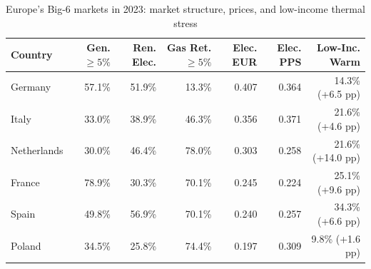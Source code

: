 \begin{table}[ht]
\centering
\caption{Europe's Big-6 markets in 2023: market structure, prices, and low-income thermal stress}
\label{tab:big6_2023}
\small
\begin{tabular}{@{}lrrrrrr@{}}
\toprule
Country & Gen. $\ge 5\%$ & Ren. Elec. & Gas Ret. $\ge 5\%$ & Elec. EUR & Elec. PPS & Low-Inc. Warm \\
\midrule
Germany & 57.1\% & 51.9\% & 13.3\% & 0.407 & 0.364 & 14.3\% (+6.5 pp) \\
Italy & 33.0\% & 38.9\% & 46.3\% & 0.356 & 0.371 & 21.6\% (+4.6 pp) \\
Netherlands & 30.0\% & 46.4\% & 78.0\% & 0.303 & 0.258 & 21.6\% (+14.0 pp) \\
France & 78.9\% & 30.3\% & 70.1\% & 0.245 & 0.224 & 25.1\% (+9.6 pp) \\
Spain & 49.8\% & 56.9\% & 70.1\% & 0.240 & 0.257 & 34.3\% (+6.6 pp) \\
Poland & 34.5\% & 25.8\% & 74.4\% & 0.197 & 0.309 & 9.8\% (+1.6 pp) \\
\bottomrule
\end{tabular}
\end{table}
